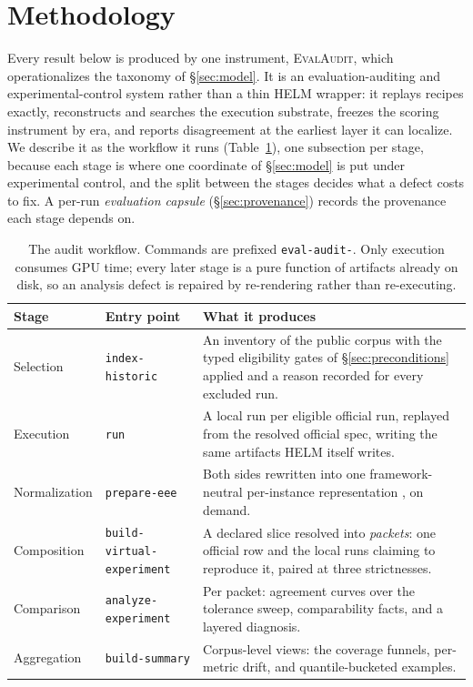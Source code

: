 \section{Methodology}
\label{sec:system}
\label{sec:pipeline}

Every result below is produced by one instrument, \textsc{EvalAudit}, which
operationalizes the taxonomy of \S\ref{sec:model}. It
is an evaluation-auditing and experimental-control system rather than a thin HELM
wrapper: it replays recipes exactly, reconstructs and searches the execution
substrate, freezes the scoring instrument by era, and reports disagreement at the
earliest layer it can localize. We describe it as the workflow it runs
(Table~\ref{tab:pipeline}), one subsection per stage, because each stage is where
one coordinate of \S\ref{sec:model} is put under experimental control, and the
split between the stages decides what a defect costs to fix. A per-run
\emph{evaluation capsule} (\S\ref{sec:provenance}) records the provenance each
stage depends on.

\begin{table}[t]
\caption{The audit workflow. Commands are prefixed \texttt{eval-audit-}. Only
execution consumes GPU time; every later stage is a pure function of artifacts
already on disk, so an analysis defect is repaired by re-rendering rather than
re-executing.}
\label{tab:pipeline}
\begin{center}
\footnotesize
\begin{tabularx}{\textwidth}{l l >{\raggedright\arraybackslash}X}
\toprule
\textbf{Stage} & \textbf{Entry point} & \textbf{What it produces} \\
\midrule
Selection     & \texttt{index-historic}           & An inventory of the public corpus with the typed eligibility gates of \S\ref{sec:preconditions} applied and a reason recorded for every excluded run. \\
Execution     & \texttt{run}                      & A local run per eligible official run, replayed from the resolved official spec, writing the same artifacts HELM itself writes. \\
Normalization & \texttt{prepare-eee}              & Both sides rewritten into one framework-neutral per-instance representation \citep{eee2026}, on demand. \\
Composition   & \texttt{build-virtual-experiment} & A declared slice resolved into \emph{packets}: one official row and the local runs claiming to reproduce it, paired at three strictnesses. \\
Comparison    & \texttt{analyze-experiment}       & Per packet: agreement curves over the tolerance sweep, comparability facts, and a layered diagnosis. \\
Aggregation   & \texttt{build-summary}            & Corpus-level views: the coverage funnels, per-metric drift, and quantile-bucketed examples. \\
\bottomrule
\end{tabularx}
\end{center}
\end{table}

